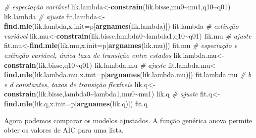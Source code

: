 \documentclass[
]{book}
\newenvironment{Shaded}{\begin{snugshade}}{\end{snugshade}}
\newcommand{\AttributeTok}[1]{\textcolor[rgb]{0.13,0.29,0.53}{#1}}
\newcommand{\CommentTok}[1]{\textcolor[rgb]{0.56,0.35,0.01}{\textit{#1}}}
\newcommand{\FunctionTok}[1]{\textcolor[rgb]{0.13,0.29,0.53}{\textbf{#1}}}
\newcommand{\NormalTok}[1]{#1}
\newcommand{\OtherTok}[1]{\textcolor[rgb]{0.56,0.35,0.01}{#1}}
\newcommand{\SpecialCharTok}[1]{\textcolor[rgb]{0.81,0.36,0.00}{\textbf{#1}}}
\begin{document}
\begin{Shaded}
\begin{Highlighting}[]
\CommentTok{\# especiação variável}
\NormalTok{lik.lambda}\OtherTok{\textless{}{-}}\FunctionTok{constrain}\NormalTok{(lik.bisse,mu0}\SpecialCharTok{\textasciitilde{}}\NormalTok{mu1,q10}\SpecialCharTok{\textasciitilde{}}\NormalTok{q01)}
\NormalTok{lik.lambda}
\CommentTok{\# ajuste}
\NormalTok{fit.lambda}\OtherTok{\textless{}{-}}\FunctionTok{find.mle}\NormalTok{(lik.lambda,}\AttributeTok{x.init=}\NormalTok{p[}\FunctionTok{argnames}\NormalTok{(lik.lambda)])}
\NormalTok{fit.lambda}
\CommentTok{\# extinção variável}
\NormalTok{lik.mu}\OtherTok{\textless{}{-}}\FunctionTok{constrain}\NormalTok{(lik.bisse,lambda0}\SpecialCharTok{\textasciitilde{}}\NormalTok{lambda1,q10}\SpecialCharTok{\textasciitilde{}}\NormalTok{q01)}
\NormalTok{lik.mu}
\CommentTok{\# ajuste}
\NormalTok{fit.mu}\OtherTok{\textless{}{-}}\FunctionTok{find.mle}\NormalTok{(lik.mu,}\AttributeTok{x.init=}\NormalTok{p[}\FunctionTok{argnames}\NormalTok{(lik.mu)])}
\NormalTok{fit.mu}
\CommentTok{\# especiação e extinção variável, única taxa de transição entre estados}
\NormalTok{lik.lambda.mu}\OtherTok{\textless{}{-}}\FunctionTok{constrain}\NormalTok{(lik.bisse,q10}\SpecialCharTok{\textasciitilde{}}\NormalTok{q01)}
\NormalTok{lik.lambda.mu}
\CommentTok{\# ajuste}
\NormalTok{fit.lambda.mu}\OtherTok{\textless{}{-}}\FunctionTok{find.mle}\NormalTok{(lik.lambda.mu,}\AttributeTok{x.init=}\NormalTok{p[}\FunctionTok{argnames}\NormalTok{(lik.lambda.mu)])}
\NormalTok{fit.lambda.mu}
\CommentTok{\# b e d constantes, taxas de transição flexíveis}
\NormalTok{lik.q}\OtherTok{\textless{}{-}}\FunctionTok{constrain}\NormalTok{(lik.bisse,lambda0}\SpecialCharTok{\textasciitilde{}}\NormalTok{lambda1,mu0}\SpecialCharTok{\textasciitilde{}}\NormalTok{mu1)}
\NormalTok{lik.q}
\CommentTok{\# ajuste}
\NormalTok{fit.q}\OtherTok{\textless{}{-}}\FunctionTok{find.mle}\NormalTok{(lik.q,}\AttributeTok{x.init=}\NormalTok{p[}\FunctionTok{argnames}\NormalTok{(lik.q)])}
\NormalTok{fit.q}
\end{Highlighting}
\end{Shaded}

Agora podemos comparar os modelos ajustados. A função genérica anova permite
obter os valores de AIC para uma lista.

\begin{Shaded}
\end{Shaded}
\end{document}
